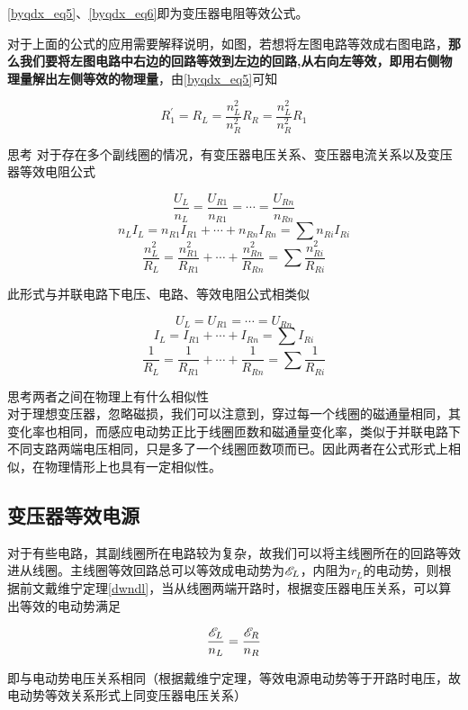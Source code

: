 \eqref{byqdx_eq5}、\eqref{byqdx_eq6}即为变压器电阻等效公式。



对于上面的公式的应用需要解释说明，如图，若想将左图电路等效成右图电路，\textbf{那么我们要将左图电路中右边的回路等效到左边的回路,从右向左等效，即用右侧物理量解出左侧等效的物理量}，由\eqref{byqdx_eq5}可知

$$R_1^{\prime} = R_L = \frac{n_L^2}{n_R^2} R_R = \frac{n_L^2}{n_R^2} R_1$$

\begin{mk}{思考}{}
对于存在多个副线圈的情况，有变压器电压关系、变压器电流关系以及变压器等效电阻公式

$$\frac{U_L}{n_L} = \frac{U_{R1}}{n_{R1}} = \cdots = \frac{U_{Rn}}{n_{Rn}}$$
$$n_L I_L = n_{R1} I_{R1} + \cdots + n_{Rn} I_{Rn} = \sum n_{Ri} I_{Ri}$$
$$\frac{n_{L}^2}{R_L} =\frac{n_{R1}^2}{R_{R1}} + \cdots + \frac{n_{Rn}^2}{R_{Rn}} = \sum \frac{n_{Ri}^2}{R_{Ri}}$$

此形式与并联电路下电压、电路、等效电阻公式相类似

$$U_L = U_{R1} = \cdots = U_{Rn}$$
$$I_L = I_{R1} + \cdots + I_{Rn} = \sum I_{Ri}$$
$$\frac{1}{R_L} = \frac{1}{R_{R1}} + \cdots + \frac{1}{R_{Rn}} = \sum \frac{1}{R_{Ri}}$$

思考两者之间在物理上有什么相似性
~\\

对于理想变压器，忽略磁损，我们可以注意到，穿过每一个线圈的磁通量相同，其变化率也相同，而感应电动势正比于线圈匝数和磁通量变化率，类似于并联电路下不同支路两端电压相同，只是多了一个线圈匝数项而已。因此两者在公式形式上相似，在物理情形上也具有一定相似性。
\end{mk}

\subsection{变压器等效电源}



对于有些电路，其副线圈所在电路较为复杂，故我们可以将主线圈所在的回路等效进从线圈。主线圈等效回路总可以等效成电动势为$\mathscr{E}_L$，内阻为$r_L$的电动势，则根据前文戴维宁定理\eqref{dwndl}，当从线圈两端开路时，根据变压器电压关系，可以算出等效的电动势满足

$$\frac{\mathscr{E}_L}{n_L} = \frac{\mathscr{E}_R}{n_R}$$

即与电动势电压关系相同（根据戴维宁定理，等效电源电动势等于开路时电压，故电动势等效关系形式上同变压器电压关系）

